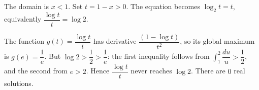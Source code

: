 The domain is $x<1$. Set $t=1-x>0$. The equation becomes $\log_2t=t$, equivalently $\dfrac{\log t}{t}=\log2$.

The function $g(t)=\dfrac{\log t}{t}$ has derivative $\dfrac{(1-\log t)}{t^2}$, so its global maximum is $g(e)=\dfrac{1}{e}$. But $\log2>\dfrac{1}{2}>\dfrac{1}{e}$: the first inequality follows from $\int_1^2\dfrac{du}{u}>\dfrac{1}{2}$, and the second from $e>2$. Hence $\dfrac{\log t}{t}$ never reaches $\log2$. There are $\boxed0$ real solutions.
